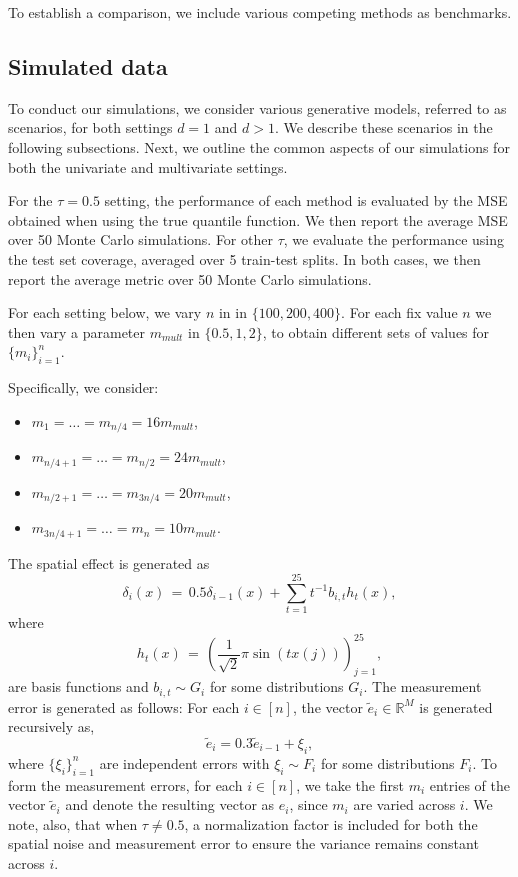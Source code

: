 \documentclass[twoside,11pt]{article}
\newcommand{\rev}[1]{{\color{revisionred}#1}}
\begin{document}
To establish a comparison, we include various competing methods as benchmarks. 

\subsection{Simulated data}
\label{subsec:simulated_data}
To conduct our simulations, we consider various generative models, referred to as scenarios, for both settings \( d = 1 \) and \( d > 1 \). We describe these scenarios in the following subsections. Next, we outline the common aspects of our simulations for both the univariate and multivariate settings.

For the $\tau = 0.5$ setting, the performance of each method is evaluated by the MSE obtained when using the true quantile function. We then report the average MSE over 50 Monte Carlo simulations. For other $\tau$, we evaluate the performance using the test set coverage, averaged over 5 train-test splits. In both cases, we then report the average metric over 50 Monte Carlo simulations. 

For each setting below, we vary \( n \) in in \( \{100, 200, 400\} \). For each fix value \( n \) we then vary a parameter \( m_{mult} \) in \( \{0.5, 1, 2\} \), to obtain different sets of values for \( \{m_i\}_{i=1}^{n} \).


 Specifically, we consider:
\begin{itemize}
    \item \( m_1 = \ldots = m_{n/4} = 16m_{mult} \),
    \item \( m_{n/4+1} = \ldots = m_{n/2} = 24m_{mult} \),
    \item \( m_{n/2+1} = \ldots = m_{3n/4} = 20m_{mult} \),
    \item \( m_{3n/4+1} = \ldots = m_n = 10m_{mult} \).
\end{itemize}



\rev{The spatial effect is generated as} 
\begin{equation}\label{eq:st_delta_def}
\delta_i(x) \,=\, 0.5\delta_{i-1}(x) + \sum_{t=1}^{25} t^{-1}b_{i,t}h_t(x), 
\end{equation}
where
\begin{equation}
\label{eq:h_t_def}
h_t(x) \,=\, \left(\frac{1}{\sqrt{2}}\pi \sin(tx(j))\right)_{j=1}^{25},
\end{equation}
are basis functions and $b_{i,t}\sim G_i$ for some distributions $G_i$. The measurement error is generated as follows: For each \(i \in [n]\), the vector \(\tilde e_i \in \mathbb{R}^M\) is generated recursively as, 
\begin{equation}\label{eq:st_e_def}
\tilde e_i = 0.3 \tilde e_{i-1} + \xi_i,
\end{equation}
where \(\{\xi_{i}\}_{i=1}^{n}\) are independent errors with $\xi_i \sim F_i$ for some distributions $F_i$. To form the measurement errors, for each \(i \in [n]\), we take the first \(m_i\) entries of the vector \(\tilde e_i\) and denote the resulting vector as \(e_i\), since $m_i$ are varied across $i$. We note, also, that when $\tau \neq 0.5$, a normalization factor is included for both the spatial noise and measurement error to ensure the variance remains constant across $i$. 
\end{document}
